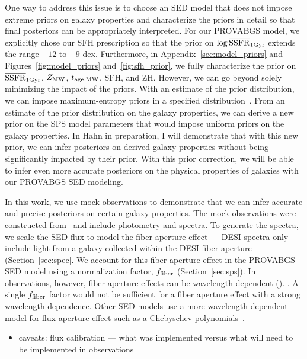 One way to address this issue  is to choose an SED model that does not impose
extreme priors on galaxy properties and characterize the priors in detail so
that final posteriors can be appropriately  interpreted. 
For our {\sc PROVABGS} model, we explicitly chose our SFH prescription so that
the prior on $\log\overline{\rm SSFR}_{\rm 1Gyr}$ extends the range $-12$ to $-9$ dex.
Furthermore, in Appendix~\ref{sec:model_priors} and
Figures~\ref{fig:model_priors} and~\ref{fig:sfh_prior}, we fully characterize
the prior on $\overline{\rm SSFR}_{\rm 1Gyr}$, $Z_{\rm MW}$, $t_{\rm age, MW}$, SFH, and ZH.
However, we can go beyond solely minimizing the impact of the priors. 
With an estimate of the prior distribution, we can impose maximum-entropy
priors in a specified distribution~\citep{handley2019}. 
From an estimate of the prior distribution on the galaxy properties, we can
derive a new prior on the SPS model parameters that would impose uniform priors
on the galaxy properties. 
In Hahn in preparation, I will demonstrate that with this new prior, we can
infer posteriors on derived galaxy properties without being significantly
impacted by their prior. 
With this prior correction, we will be able to infer even more accurate
posteriors on the physical properties of galaxies with our {\sc PROVABGS} SED
modeling.

In this work, we use mock observations to demonstrate that we can infer
accurate and precise posteriors on certain galaxy properties.
The mock observations were constructed from \lgal~and include photometry and
spectra. 
To generate the spectra, we scale the SED flux to model the fiber aperture
effect --- DESI spectra only include light from a galaxy collected within the
DESI fiber aperture (Section~\ref{sec:spec}. 
We account for this fiber aperture effect in the {\sc PROVABGS} SED model using 
a normalization factor, $f_{\rm fiber}$ (Section~\ref{sec:sps}). 
In observations, however, fiber aperture effects can be wavelength dependent
(). 
. 
A single $f_{\rm fiber}$ factor would not be sufficient for a fiber aperture
effect with a strong wavelength dependence. 
Other SED models use a more wavelength dependent model for flux aperture effect
such as a Chebyschev polynomials~\citep[\emph{e.g.}][]{}. 
\begin{itemize}
    \item caveats: flux calibration --- what was implemented versus what will
    need to be implemented in observations
\end{itemize}



